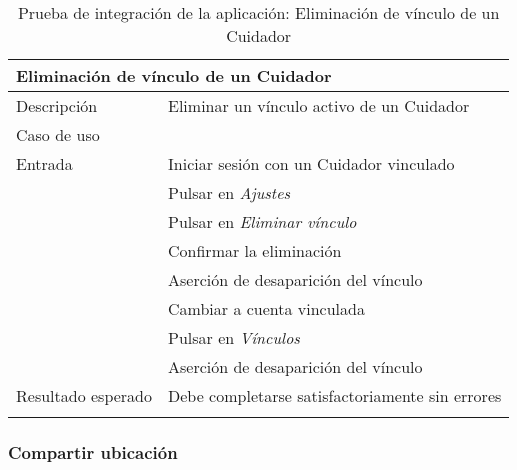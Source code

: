 \vspace{-20pt}
\begin{longtable}{|p{} p{}|}
    \hline
    \multicolumn{2}{|l|}{\textbf{Eliminación de vínculo de un Cuidador}} \\ \hline 
    Descripción                 & Eliminar un vínculo activo de un Cuidador \\ \hline
    Caso de uso                 & \nameref{cu:desvincular} \\ \hline
    Entrada                     & Iniciar sesión con un Cuidador vinculado \\
                                & Pulsar en \emph{Ajustes} \\
                                & Pulsar en \emph{Eliminar vínculo} \\
                                & Confirmar la eliminación \\
                                & Aserción de desaparición del vínculo \\
                                & Cambiar a cuenta vinculada \\
                                & Pulsar en \emph{Vínculos} \\
                                & Aserción de desaparición del vínculo \\ \hline
    Resultado esperado          & Debe completarse satisfactoriamente sin errores \\ \hline
    \caption{Prueba de integración de la aplicación: Eliminación de vínculo de un Cuidador}
    \label{cp:i:app:eliminacion_vinculo_cuidador}
\end{longtable}

\subsubsection{Compartir ubicación}

